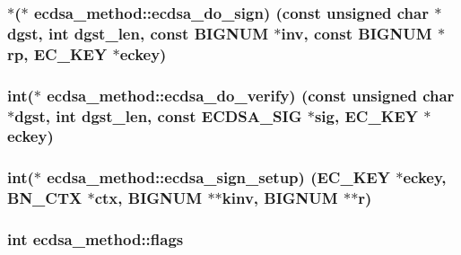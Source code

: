 \subsubsection[{\texorpdfstring{ecdsa\+\_\+do\+\_\+sign}{ecdsa_do_sign}}]{$\ast$($\ast$ ecdsa\+\_\+method\+::ecdsa\+\_\+do\+\_\+sign) (const unsigned char $\ast$dgst, int dgst\+\_\+len, const {\bf B\+I\+G\+N\+UM} $\ast$inv, const {\bf B\+I\+G\+N\+UM} $\ast$rp, {\bf E\+C\+\_\+\+K\+EY} $\ast$eckey)}\hypertarget{structecdsa__method_ab3ecb28fb054cca5704a67fc40ffe5c7}{}\label{structecdsa__method_ab3ecb28fb054cca5704a67fc40ffe5c7}
\subsubsection[{\texorpdfstring{ecdsa\+\_\+do\+\_\+verify}{ecdsa_do_verify}}]{\setlength{\rightskip}{0pt plus 5cm}int($\ast$ ecdsa\+\_\+method\+::ecdsa\+\_\+do\+\_\+verify) (const unsigned char $\ast$dgst, int dgst\+\_\+len, const {\bf E\+C\+D\+S\+A\+\_\+\+S\+IG} $\ast$sig, {\bf E\+C\+\_\+\+K\+EY} $\ast$eckey)}\hypertarget{structecdsa__method_ad90c7a028980ae216584c7a41bd2da83}{}\label{structecdsa__method_ad90c7a028980ae216584c7a41bd2da83}
\subsubsection[{\texorpdfstring{ecdsa\+\_\+sign\+\_\+setup}{ecdsa_sign_setup}}]{\setlength{\rightskip}{0pt plus 5cm}int($\ast$ ecdsa\+\_\+method\+::ecdsa\+\_\+sign\+\_\+setup) ({\bf E\+C\+\_\+\+K\+EY} $\ast$eckey, {\bf B\+N\+\_\+\+C\+TX} $\ast$ctx, {\bf B\+I\+G\+N\+UM} $\ast$$\ast$kinv, {\bf B\+I\+G\+N\+UM} $\ast$$\ast$r)}\hypertarget{structecdsa__method_a4d80e5379f44922ff30c9843d6833e5c}{}\label{structecdsa__method_a4d80e5379f44922ff30c9843d6833e5c}
\subsubsection[{\texorpdfstring{flags}{flags}}]{\setlength{\rightskip}{0pt plus 5cm}int ecdsa\+\_\+method\+::flags}\hypertarget{structecdsa__method_a5be789616b55be45d3898bcbde0affe9}{}\label{structecdsa__method_a5be789616b55be45d3898bcbde0affe9}
